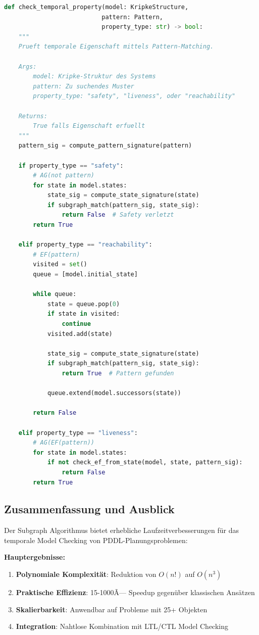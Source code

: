 ﻿\documentclass[a4paper,12pt]{article}
\theoremstyle{definition}
\begin{document}
\begin{lstlisting}[language=Python, caption=Pattern-Matching für Temporale Eigenschaften]
def check_temporal_property(model: KripkeStructure, 
                           pattern: Pattern, 
                           property_type: str) -> bool:
    """
    Prueft temporale Eigenschaft mittels Pattern-Matching.
    
    Args:
        model: Kripke-Struktur des Systems
        pattern: Zu suchendes Muster
        property_type: "safety", "liveness", oder "reachability"
    
    Returns:
        True falls Eigenschaft erfuellt
    """
    pattern_sig = compute_pattern_signature(pattern)
    
    if property_type == "safety":
        # AG(not pattern)
        for state in model.states:
            state_sig = compute_state_signature(state)
            if subgraph_match(pattern_sig, state_sig):
                return False  # Safety verletzt
        return True
    
    elif property_type == "reachability":
        # EF(pattern)
        visited = set()
        queue = [model.initial_state]
        
        while queue:
            state = queue.pop(0)
            if state in visited:
                continue
            visited.add(state)
            
            state_sig = compute_state_signature(state)
            if subgraph_match(pattern_sig, state_sig):
                return True  # Pattern gefunden
            
            queue.extend(model.successors(state))
        
        return False
    
    elif property_type == "liveness":
        # AG(EF(pattern))
        for state in model.states:
            if not check_ef_from_state(model, state, pattern_sig):
                return False
        return True
\end{lstlisting}

\subsection{Zusammenfassung und Ausblick}

Der Subgraph Algorithmus bietet erhebliche Laufzeitverbesserungen
für das temporale Model Checking von PDDL-Planungsproblemen:

\textbf{Hauptergebnisse:}
\begin{enumerate}
	\item \textbf{Polynomiale Komplexität}: Reduktion von $O(n!)$ auf $O(n^3)$
	\item \textbf{Praktische Effizienz}: 15-1000Ã— Speedup gegenüber klassischen Ansätzen
	\item \textbf{Skalierbarkeit}: Anwendbar auf Probleme mit 25+ Objekten
	\item \textbf{Integration}: Nahtlose Kombination mit LTL/CTL Model Checking
\end{enumerate}
\end{document}
